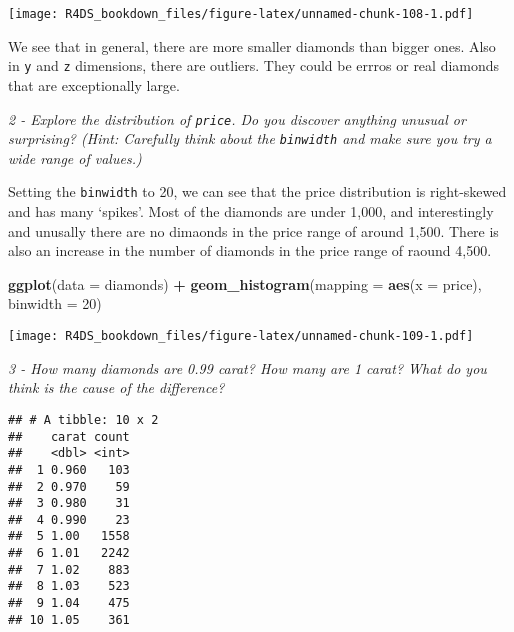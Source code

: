 \documentclass[]{article}
\newenvironment{Shaded}{\begin{snugshade}}{\end{snugshade}}
\newcommand{\KeywordTok}[1]{\textcolor[rgb]{0.13,0.29,0.53}{\textbf{#1}}}
\newcommand{\DataTypeTok}[1]{\textcolor[rgb]{0.13,0.29,0.53}{#1}}
\newcommand{\DecValTok}[1]{\textcolor[rgb]{0.00,0.00,0.81}{#1}}
\newcommand{\FloatTok}[1]{\textcolor[rgb]{0.00,0.00,0.81}{#1}}
\newcommand{\StringTok}[1]{\textcolor[rgb]{0.31,0.60,0.02}{#1}}
\newcommand{\OperatorTok}[1]{\textcolor[rgb]{0.81,0.36,0.00}{\textbf{#1}}}
\newcommand{\NormalTok}[1]{#1}
\theoremstyle{definition}
\theoremstyle{definition}
\theoremstyle{definition}
\theoremstyle{remark}
\begin{document}
\texttt{[image: R4DS\_bookdown\_files/figure-latex/unnamed-chunk-108-1.pdf]}

We see that in general, there are more smaller diamonds than bigger
ones. Also in \texttt{y} and \texttt{z} dimensions, there are outliers.
They could be errros or real diamonds that are exceptionally large.

\emph{2 - Explore the distribution of \texttt{price}. Do you discover
anything unusual or surprising? (Hint: Carefully think about the
\texttt{binwidth} and make sure you try a wide range of values.)}

Setting the \texttt{binwidth} to 20, we can see that the price
distribution is right-skewed and has many `spikes'. Most of the diamonds
are under 1,000, and interestingly and unusally there are no dimaonds in
the price range of around 1,500. There is also an increase in the number
of diamonds in the price range of raound 4,500.

\begin{Shaded}
\begin{Highlighting}[]
\KeywordTok{ggplot}\NormalTok{(}\DataTypeTok{data =}\NormalTok{ diamonds) }\OperatorTok{+}
\StringTok{  }\KeywordTok{geom_histogram}\NormalTok{(}\DataTypeTok{mapping =} \KeywordTok{aes}\NormalTok{(}\DataTypeTok{x =}\NormalTok{ price), }\DataTypeTok{binwidth =} \DecValTok{20}\NormalTok{)}
\end{Highlighting}
\end{Shaded}

\texttt{[image: R4DS\_bookdown\_files/figure-latex/unnamed-chunk-109-1.pdf]}

\emph{3 - How many diamonds are 0.99 carat? How many are 1 carat? What
do you think is the cause of the difference?}

\begin{Shaded}
\end{Shaded}

\begin{verbatim}
## # A tibble: 10 x 2
##    carat count
##    <dbl> <int>
##  1 0.960   103
##  2 0.970    59
##  3 0.980    31
##  4 0.990    23
##  5 1.00   1558
##  6 1.01   2242
##  7 1.02    883
##  8 1.03    523
##  9 1.04    475
## 10 1.05    361
\end{verbatim}
\end{document}
